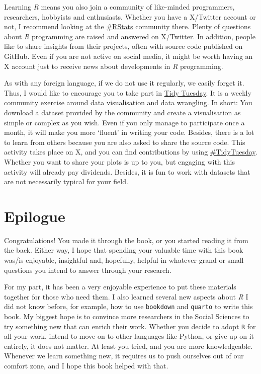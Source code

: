 \documentclass[
  letterpaper,
  DIV=11,
  numbers=noendperiod]{scrreprt}
\begin{document}
Learning \emph{R} means you also join a community of like-minded
programmers, researchers, hobbyists and enthusiasts. Whether you have a
X/Twitter account or not, I recommend looking at the
\href{https://twitter.com/search?q=\%23rstats}{\#RStats} community
there. Plenty of questions about \emph{R} programming are raised and
answered on X/Twitter. In addition, people like to share insights from
their projects, often with source code published on GitHub. Even if you
are not active on social media, it might be worth having an X account
just to receive news about developments in \emph{R} programming.

As with any foreign language, if we do not use it regularly, we easily
forget it. Thus, I would like to encourage you to take part in
\href{https://www.tidytuesday.com}{Tidy Tuesday}. It is a weekly
community exercise around data visualisation and data wrangling. In
short: You download a dataset provided by the community and create a
visualisation as simple or complex as you wish. Even if you only manage
to participate once a month, it will make you more `fluent' in writing
your code. Besides, there is a lot to learn from others because you are
also asked to share the source code. This activity takes place on X, and
you can find contributions by using
\href{https://twitter.com/search?q=\%23tidytuesday}{\#TidyTuesday}.
Whether you want to share your plots is up to you, but engaging with
this activity will already pay dividends. Besides, it is fun to work
with datasets that are not necessarily typical for your field.


\chapter*{Epilogue}\label{sec-epilogue}


Congratulations! You made it through the book, or you started reading it
from the back. Either way, I hope that spending your valuable time with
this book was/is enjoyable, insightful and, hopefully, helpful in
whatever grand or small questions you intend to answer through your
research.

For my part, it has been a very enjoyable experience to put these
materials together for those who need them. I also learned several new
aspects about \emph{R} I did not know before, for example, how to use
\texttt{bookdown} and \texttt{quarto} to write this book. My biggest
hope is to convince more researchers in the Social Sciences to try
something new that can enrich their work. Whether you decide to adopt
\texttt{R} for all your work, intend to move on to other languages like
Python, or give up on it entirely, it does not matter. At least you
tried, and you are more knowledgeable. Whenever we learn something new,
it requires us to push ourselves out of our comfort zone, and I hope
this book helped with that.
\end{document}
